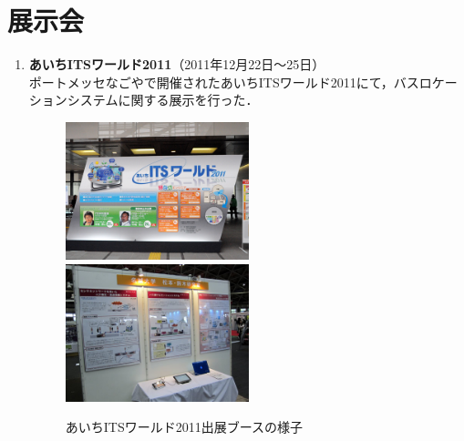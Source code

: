 \section*{展示会}
\begin{enumerate}
\item {\bf あいちITSワールド2011}（2011年12月22日〜25日）\\
ポートメッセなごやで開催されたあいちITSワールド2011にて，バスロケーションシステムに関する展示を行った．

\begin{figure}[ht]
	\centering
	\includegraphics[autoebb,clip,height=4.0cm]{fig/ITSworld1.jpg}
	\quad
	\includegraphics[autoebb,clip,height=4.0cm]{fig/ITSworld2.jpg}
	\caption{あいちITSワールド2011出展ブースの様子}
	\label{fig:ITSworld}
\end{figure}
\end{enumerate}

\endinput